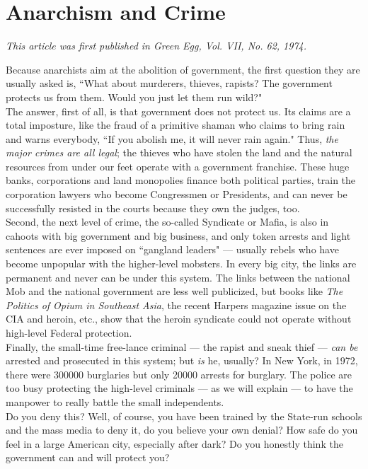 \chapter{Anarchism and Crime}

\emph{This article was first published in Green Egg, Vol. VII, No. 62, 1974.\\}

Because anarchists aim at the abolition of government, the first question they are usually asked is, ``What about murderers, thieves, rapists? The government protects us from them. Would you just let them run wild?"\\
The answer, first of all, is that government does not protect us. Its claims are a total imposture, like the fraud of a primitive shaman who claims to bring rain and warns everybody, ``If you abolish me, it will never rain again." Thus, \emph{the major crimes are all legal}; the thieves who have stolen the land and the natural resources from under our feet operate with a government franchise. These huge banks, corporations and land monopolies finance both political parties, train the corporation lawyers who become Congressmen or Presidents, and can never be successfully resisted in the courts because they own the judges, too.\\
Second, the next level of crime, the so-called Syndicate or Mafia, is also in cahoots with big government and big business, and only token arrests and light sentences are ever imposed on ``gangland leaders" --- usually rebels who have become unpopular with the higher-level mobsters. In every big city, the links are permanent and never can be under this system. The links between the national Mob and the national government are less well publicized, but books like \emph{The Politics of Opium in Southeast Asia}, the recent Harpers magazine issue on the CIA and heroin, etc., show that the heroin syndicate could not operate without high-level Federal protection.\\
Finally, the small-time free-lance criminal --- the rapist and sneak thief --- \emph{can be} arrested and prosecuted in this system; but \emph{is} he, usually? In New York, in 1972, there were 300000 burglaries but only 20000 arrests for burglary. The police are too busy protecting the high-level criminals --- as we will explain --- to have the manpower to really battle the small independents.\\
Do you deny this? Well, of course, you have been trained by the State-run schools and the mass media to deny it, do you believe your own denial? How safe do you feel in a large American city, especially after dark? Do you honestly think the government can and will protect you?

